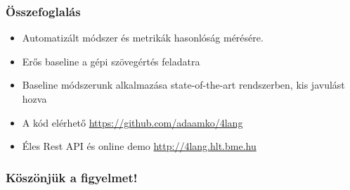 \documentclass[bigger]{beamer}
\begin{document}

\begin{frame}
\frametitle{Összefoglalás}
	\begin{itemize}
	    \pause \item Automatizált módszer és metrikák hasonlóság mérésére.
	    \pause \item Erős baseline a gépi szövegértés feladatra
	    \pause \item Baseline módszerunk alkalmazása state-of-the-art rendszerben, kis javulást hozva
	    \pause \item A kód elérhető \url{https://github.com/adaamko/4lang}
	    \pause \item Éles Rest API és online demo \url{http://4lang.hlt.bme.hu}
	\end{itemize}

\end{frame}
\begin{frame}
    \frametitle{K\"osz\"onj\"uk a figyelmet!}
    \AtNextBibliography{\tiny}
    \printbibliography
\end{frame}
\end{document}

